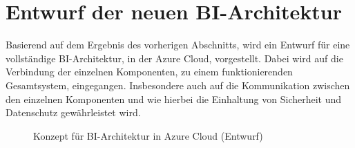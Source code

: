 \section{Entwurf der neuen BI-Architektur} \label{sec:entwurfBIArchitektur}
Basierend auf dem Ergebnis des vorherigen Abschnitts, wird ein Entwurf für eine vollständige BI-Architektur, in der Azure Cloud, vorgestellt. Dabei wird auf die Verbindung der einzelnen Komponenten, zu einem funktionierenden Gesamtsystem, eingegangen. Insbesondere auch auf die Kommunikation zwischen den einzelnen Komponenten und wie hierbei die Einhaltung von Sicherheit und Datenschutz gewährleistet wird.

\begin{figure}[htbp]
 \centering
 
 \caption{Konzept für BI-Architektur in Azure Cloud (Entwurf)}
\label{fig:chap03_4_konzeptArchitektur}
\end{figure}